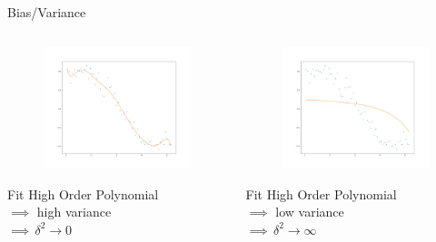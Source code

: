 \documentclass{beamer}
\begin{document}
\begin{frame}{Bias/Variance}
\begin{columns}
\begin{column}{0.4\textwidth}
\begin{figure}
\includegraphics[width=\linewidth]{ridge/rid_plot_15.png}
\end{figure}
Fit High Order Polynomial \\
$\implies$ high variance \\
$\implies \, \delta^2 \rightarrow 0$
\end{column}
\begin{column}{0.4\textwidth}
\begin{figure}
\includegraphics[width=\linewidth]{ridge/rid_plot_9.png}
\end{figure}
Fit High Order Polynomial \\
$\implies$ low variance \\
$\implies \, \delta^2 \rightarrow \infty$
\end{column}
\end{columns}
\end{frame}
\end{document}
